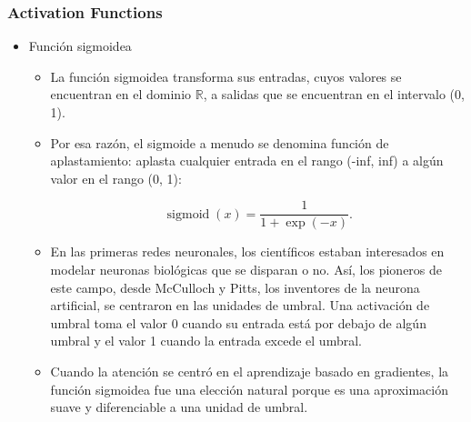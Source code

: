 \documentclass[
  shownotes,
  xcolor={svgnames},
  hyperref={colorlinks,citecolor=DarkBlue,linkcolor=DarkRed,urlcolor=DarkBlue}
  , aspectratio=169]{beamer}
\begin{document}
\begin{frame}
\frametitle{Activation Functions}





\begin{itemize}

\item Función sigmoidea

\begin{itemize}



\item La función sigmoidea transforma sus entradas, cuyos valores se encuentran en el dominio $\mathbb{R}$, a salidas que se encuentran en el intervalo (0, 1). 
\item Por esa razón, el sigmoide a menudo se denomina función de aplastamiento: aplasta cualquier entrada en el rango (-inf, inf) a algún valor en el rango (0, 1):

$$\operatorname{sigmoid}(x) = \frac{1}{1 + \exp(-x)}.$$

\item En las primeras redes neuronales, los científicos estaban interesados en modelar neuronas biológicas que se disparan o no. Así, los pioneros de este campo, desde McCulloch y Pitts, los inventores de la neurona artificial, se centraron en las unidades de umbral. Una activación de umbral toma el valor 0 cuando su entrada está por debajo de algún umbral y el valor 1 cuando la entrada excede el umbral.

\item Cuando la atención se centró en el aprendizaje basado en gradientes, la función sigmoidea fue una elección natural porque es una aproximación suave y diferenciable a una unidad de umbral.

    \end{itemize}
\end{itemize}    



\end{frame}
\end{document}
